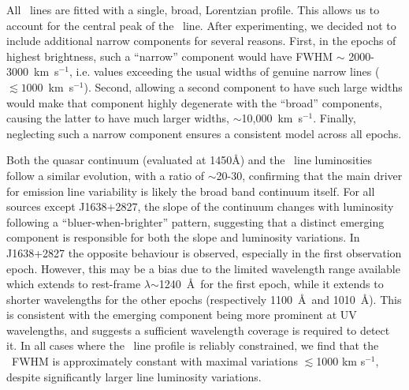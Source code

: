 \documentclass[fleqn,usenatbib]{mnras}
\begin{document}
All \civ\ lines are fitted with a single, broad, Lorentzian profile.
This allows us to account for the central peak of the \civ\ line.
After experimenting, we decided not to include additional narrow
components for several reasons.  First, in the epochs of highest
brightness, such a ``narrow'' component would have FWHM $\sim$
2000-3000~km~s$^{-1}$, i.e. values exceeding the usual widths of
genuine narrow lines ($\lesssim 1000$~km~s$^{-1}$). Second, allowing a
second component to have such large widths would make that component
highly degenerate with the ``broad'' components, causing the latter to
have much larger widths, $\sim$10,000~km~s$^{-1}$.  Finally,
neglecting such a narrow component ensures a consistent model across
all epochs.

Both the quasar continuum (evaluated at 1450\AA) and the \civ\ line
luminosities follow a similar evolution, with a ratio of $\sim$20-30,
confirming that the main driver for emission line variability is
likely the broad band continuum itself.  For all sources except
J1638+2827, the slope of the continuum changes with luminosity
following a ``bluer-when-brighter'' pattern, suggesting that a
distinct emerging component is responsible for both the slope and
luminosity variations.  In J1638+2827 the opposite behaviour is
observed, especially in the first observation epoch.  However, this
may be a bias due to the limited wavelength range available which
extends to rest-frame $\lambda$$\sim$1240~\AA\ for the first epoch,
while it extends to shorter wavelengths for the other epochs
(respectively 1100~\AA\ and 1010~\AA).  This is consistent with the
emerging component being more prominent at UV wavelengths, and
suggests a sufficient wavelength coverage is required to detect it. In
all cases where the \civ\ line profile is reliably constrained, we
find that the \civ\ FWHM is approximately constant with maximal 
variations $\lesssim$1000 km s$^{-1}$, despite significantly larger
line luminosity variations.
\end{document}
